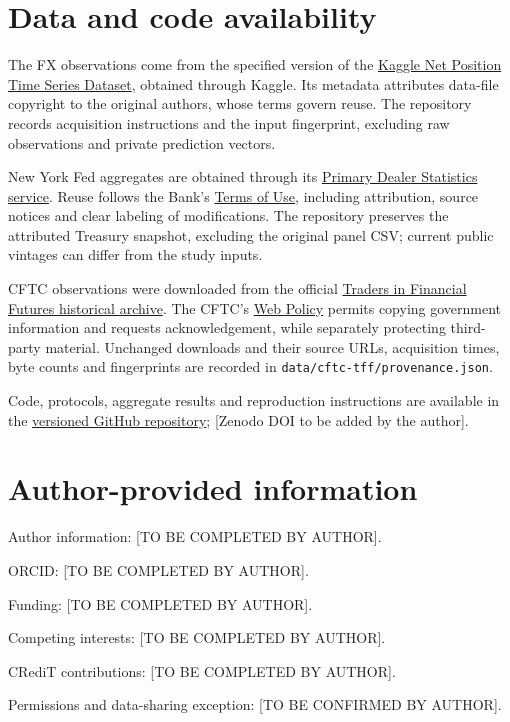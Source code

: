 \documentclass[11pt,a4paper]{article}
\begin{document}
\FloatBarrier

\section*{Data and code availability}
The FX observations come from the specified version of the \href{https://www.kaggle.com/datasets/davidlindsay1979/net-position-time-series-dataset}{Kaggle Net Position Time Series Dataset}, obtained through Kaggle. Its metadata attributes data-file copyright to the original authors, whose terms govern reuse. The repository records acquisition instructions and the input fingerprint, excluding raw observations and private prediction vectors.

New York Fed aggregates are obtained through its \href{https://www.newyorkfed.org/markets/counterparties/primary-dealers-statistics}{Primary Dealer Statistics service}. Reuse follows the Bank's \href{https://www.newyorkfed.org/privacy/termsofuse.html}{Terms of Use}, including attribution, source notices and clear labeling of modifications. The repository preserves the attributed Treasury snapshot, excluding the original panel CSV; current public vintages can differ from the study inputs.

CFTC observations were downloaded from the official \href{https://www.cftc.gov/MarketReports/CommitmentsofTraders/HistoricalCompressed/index.htm}{Traders in Financial Futures historical archive}. The CFTC's \href{https://www.cftc.gov/sites/default/files/cftc/cftcprivacy.htm}{Web Policy} permits copying government information and requests acknowledgement, while separately protecting third-party material. Unchanged downloads and their source URLs, acquisition times, byte counts and fingerprints are recorded in \texttt{data/cftc-tff/provenance.json}.

Code, protocols, aggregate results and reproduction instructions are available in the \href{https://github.com/ByronLi0207/financial-mathematics-paper-20261020/tree/submission-final}{versioned GitHub repository}; [Zenodo DOI to be added by the author].

\section*{Author-provided information}
Author information: [TO BE COMPLETED BY AUTHOR].\par
ORCID: [TO BE COMPLETED BY AUTHOR].\par
Funding: [TO BE COMPLETED BY AUTHOR].\par
Competing interests: [TO BE COMPLETED BY AUTHOR].\par
CRediT contributions: [TO BE COMPLETED BY AUTHOR].\par
Permissions and data-sharing exception: [TO BE CONFIRMED BY AUTHOR].\par
\end{document}
